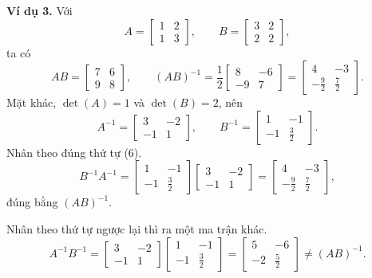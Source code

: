 \documentclass[12pt,a4paper]{article}
\begin{document}
\textbf{Ví dụ 3.} Với
$$
A=\left[ \begin{array}{rr} 1 & 2\\ 1 & 3 \end{array} \right],\qquad
B=\left[ \begin{array}{rr} 3 & 2\\ 2 & 2 \end{array} \right],
$$
ta có
$$
AB=\left[ \begin{array}{rr} 7 & 6\\ 9 & 8 \end{array} \right],\qquad
(AB)^{-1}=\frac12\left[ \begin{array}{rr} 8 & -6\\ -9 & 7 \end{array} \right]=\left[ \begin{array}{rr} 4 & -3\\ -\frac92 & \frac72 \end{array} \right].
$$
Mặt khác, \(\det(A)=1\) và \(\det(B)=2\), nên
$$
A^{-1}=\left[ \begin{array}{rr} 3 & -2\\ -1 & 1 \end{array} \right],\qquad
B^{-1}=\left[ \begin{array}{rr} 1 & -1\\ -1 & \frac32 \end{array} \right].
$$
Nhân theo đúng thứ tự (6).
$$
B^{-1}A^{-1}
=\left[ \begin{array}{rr} 1 & -1\\ -1 & \frac32 \end{array} \right]\left[ \begin{array}{rr} 3 & -2\\ -1 & 1 \end{array} \right]
=\left[ \begin{array}{rr} 4 & -3\\ -\frac92 & \frac72 \end{array} \right],
$$
đúng bằng \((AB)^{-1}\).

Nhân theo thứ tự ngược lại thì ra một ma trận khác.
$$
A^{-1}B^{-1}
=\left[ \begin{array}{rr} 3 & -2\\ -1 & 1 \end{array} \right]\left[ \begin{array}{rr} 1 & -1\\ -1 & \frac32 \end{array} \right]
=\left[ \begin{array}{rr} 5 & -6\\ -2 & \frac52 \end{array} \right]\neq (AB)^{-1}.
$$
\end{document}
